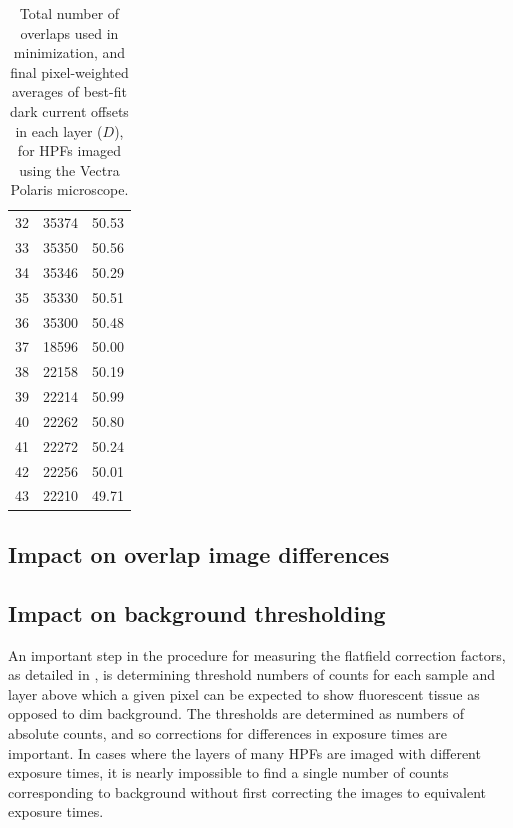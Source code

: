 \documentclass[letterpaper,11pt]{article}
\begin{document}
\begin{table}[!htb]
\begin{tabular}{c c c}
32          & 35374              & 50.53 \\
33          & 35350              & 50.56 \\
34          & 35346              & 50.29 \\
35          & 35330              & 50.51 \\
36          & 35300              & 50.48 \\
37          & 18596              & 50.00 \\
38          & 22158              & 50.19 \\
39          & 22214              & 50.99 \\
40          & 22262              & 50.80 \\
41          & 22272              & 50.24 \\
42          & 22256              & 50.01 \\
43          & 22210              & 49.71 \\
\hline
\end{tabular}
\caption{\footnotesize Total number of overlaps used in minimization, and final pixel-weighted averages of best-fit dark current offsets in each layer ($D$), for HPFs imaged using the Vectra Polaris microscope.}
\label{tab:best_offsets_polaris}
\end{table}

\subsection{Impact on overlap image differences}
\label{ssec:impact_on_overlap_image_differences}

\subsection{Impact on background thresholding}
\label{ssec:impact_on_background_threshold}

An important step in the procedure for measuring the flatfield correction factors, as detailed in \cite{flatfielding_note}, is determining threshold numbers of counts for each sample and layer above which a given pixel can be expected to show fluorescent tissue as opposed to dim background. The thresholds are determined as numbers of absolute counts, and so corrections for differences in exposure times are important. In cases where the layers of many HPFs are imaged with different exposure times, it is nearly impossible to find a single number of counts corresponding to background without first correcting the images to equivalent exposure times.
\end{document}
